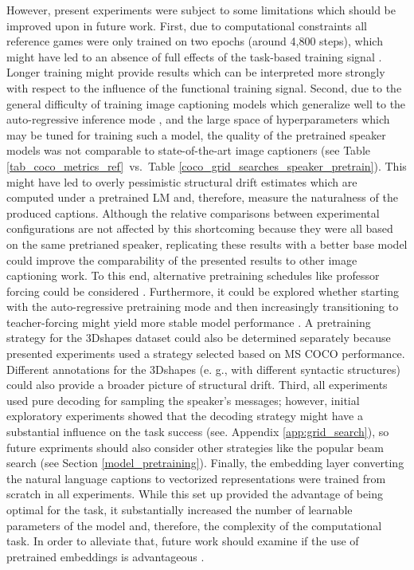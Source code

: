 However, present experiments were subject to some limitations which should be improved upon in future work. First, due to computational constraints all reference games were only trained on two epochs (around 4,800 steps), which might have led to an absence of full effects of the task-based training signal \parencite[compared to, e.g.,][who had 300,000 training steps]{lee2019countering}. Longer training might provide results which can be interpreted more strongly with respect to the influence of the functional training signal. Second, due to the general difficulty of training image captioning models which generalize well to the auto-regressive inference mode \parencite{lamb2016professor}, and the large space of hyperparameters which may be tuned for training such a model, the quality of the pretrained speaker models was not comparable to state-of-the-art image captioners (see Table \ref{tab_coco_metrics_ref}~vs.~Table \ref{coco_grid_searches_speaker_pretrain}). This might have led to overly pessimistic structural drift estimates which are computed under a pretrained LM and, therefore, measure the naturalness of the produced captions. Although the relative comparisons between experimental configurations are not affected by this shortcoming because they were all based on the same pretrianed speaker, replicating these results with a better base model could improve the comparability of the presented results to other image captioning work. To this end, alternative pretraining schedules like professor forcing could be considered \parencite{lamb2016professor}. Furthermore, it could be explored whether starting with the auto-regressive pretraining mode and then increasingly transitioning to teacher-forcing might yield more stable model performance \parencite[although similar explorations by][suggest that this order might nnot work very well]{lowe2020interaction}. A pretraining strategy for the 3Dshapes dataset could also be determined separately because presented experiments used a strategy selected based on MS COCO performance. Different annotations for the 3Dshapes (e. g., with different syntactic structures) could also provide a broader picture of structural drift.
Third, all experiments used pure decoding for sampling the speaker's messages; however, initial exploratory experiments showed that the decoding strategy might have a substantial influence on the task success (see. Appendix \ref{app:grid_search}), so future expriments should also consider other strategies like the popular beam search (see Section \ref{model_pretraining}).  
Finally, the embedding layer converting the natural language captions to vectorized representations were trained from scratch in all experiments. While this set up provided the advantage of being optimal for the task, it substantially increased the number of learnable parameters of the model and, therefore, the complexity of the computational task. In order to alleviate that, future work should examine if the use of pretrained embeddings is advantageous \parencite[following, e.~g.,][]{atliha2021pretrained}.

